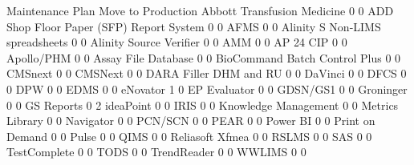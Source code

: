 \documentclass{article}
\begin{document}
\begin{Schunk}
\begin{Soutput}
                                           Maintenance Plan Move to Production
  Abbott Transfusion Medicine                             0                  0
  ADD Shop Floor Paper (SFP) Report System                0                  0
  AFMS                                                    0                  0
  Alinity S Non-LIMS spreadsheets                         0                  0
  Alinity Source Verifier                                 0                  0
  AMM                                                     0                  0
  AP 24 CIP                                               0                  0
  Apollo/PHM                                              0                  0
  Assay File Database                                     0                  0
  BioCommand Batch Control Plus                           0                  0
  CMSnext                                                 0                  0
  CMSNext                                                 0                  0
  DARA Filler DHM and RU                                  0                  0
  DaVinci                                                 0                  0
  DFCS                                                    0                  0
  DPW                                                     0                  0
  EDMS                                                    0                  0
  eNovator                                                1                  0
  EP Evaluator                                            0                  0
  GDSN/GS1                                                0                  0
  Groninger                                               0                  0
  GS Reports                                              0                  2
  ideaPoint                                               0                  0
  IRIS                                                    0                  0
  Knowledge Management                                    0                  0
  Metrics Library                                         0                  0
  Navigator                                               0                  0
  PCN/SCN                                                 0                  0
  PEAR                                                    0                  0
  Power BI                                                0                  0
  Print on Demand                                         0                  0
  Pulse                                                   0                  0
  QIMS                                                    0                  0
  Reliasoft Xfmea                                         0                  0
  RSLMS                                                   0                  0
  SAS                                                     0                  0
  TestComplete                                            0                  0
  TODS                                                    0                  0
  TrendReader                                             0                  0
  WWLIMS                                                  0                  0
                                          

\end{Soutput}
\end{Schunk}
\end{document}

